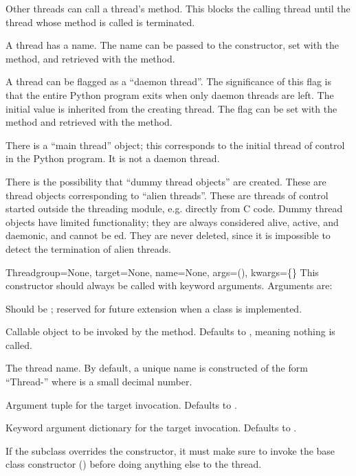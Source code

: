 Other threads can call a thread's  method.  This blocks
the calling thread until the thread whose  method is
called is terminated.

A thread has a name.  The name can be passed to the constructor,
set with the  method, and retrieved with the
 method.

A thread can be flagged as a ``daemon thread''.  The significance
of this flag is that the entire Python program exits when only
daemon threads are left.  The initial value is inherited from the
creating thread.  The flag can be set with the 
method and retrieved with the  method.

There is a ``main thread'' object; this corresponds to the
initial thread of control in the Python program.  It is not a
daemon thread.

There is the possibility that ``dummy thread objects'' are
created.  These are thread objects corresponding to ``alien
threads''.  These are threads of control started outside the
threading module, e.g. directly from C code.  Dummy thread objects
have limited functionality; they are always considered alive,
active, and daemonic, and cannot be ed.  They are never 
deleted, since it is impossible to detect the termination of alien
threads.


\begin{classdesc}{Thread}{group=None, target=None, name=None,
                          args=(), kwargs=\{\}}
This constructor should always be called with keyword
arguments.  Arguments are:

Should be ; reserved for future extension when a
 class is implemented.

Callable object to be invoked by the  method.
Defaults to , meaning nothing is called.

The thread name.  By default, a unique name is constructed of the form
``Thread-'' where  is a small decimal number.

Argument tuple for the target invocation.  Defaults to \code{()}.

Keyword argument dictionary for the target invocation.
Defaults to \code{\{\}}.

If the subclass overrides the constructor, it must make sure
to invoke the base class constructor ()
before doing anything else to the thread.
\end{classdesc}




